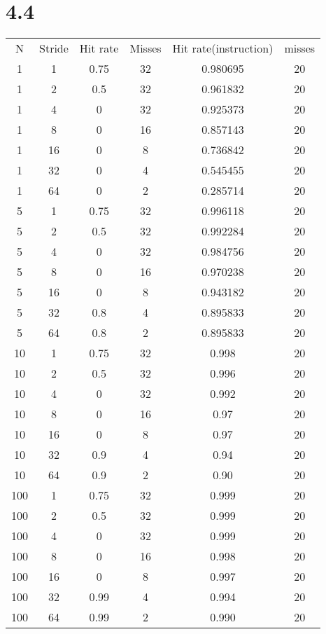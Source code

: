 \documentclass[]{article}
\begin{document}
\section*{4.4}
\begin{center}
	\begin{tabular}{c c c c c c}
		N &Stride & Hit rate & Misses & Hit rate(instruction) & misses\\
	1 & 1     &  0.75     & 32    &  0.980695    &  20\\
	1 & 2     &  0.5      & 32    &  0.961832    &  20\\
	1 & 4     &  0        & 32    &  0.925373    &  20\\
	1 & 8     &  0        & 16    &  0.857143    &  20\\
	1 & 16    &  0        &  8    &   0.736842   &20\\
	1 & 32    &  0        & 4     &  0.545455    &20 \\
	1 & 64    & 0         &2      &  0.285714    &20 \\
	5 & 1     & 0.75      &32     & 0.996118     &20 \\
	5 & 2     & 0.5       &32     & 0.992284     &20 \\
	5 & 4     & 0         & 32    &0.984756      & 20\\
	5 & 8     & 0         &16     & 0.970238     &20 \\
	5 & 16    & 0         &8      & 0.943182     & 20\\
	5 & 32    & 0.8        &4      & 0.895833     & 20\\
	5 & 64    & 0.8        &2      & 0.895833     & 20\\
	10& 1     & 0.75       &32    &0.998          &20\\
	10& 2     &0.5         &32    &0.996         &20\\
	10& 4     &0           &32    &0.992          &20\\
	10& 8     &0           &16    &0.97          &20\\
	10& 16    &0           &8      &0.97         &20\\
	10& 32    &0.9         &4     &0.94         &20\\
	10& 64    &0.9        &2      &0.90          &20\\
	100&1     &0.75       &32     &0.999        &20\\
	100&2     &0.5       &32     &0.999        &20\\
	100&4     &0         &32     &0.999        &20\\
	100&8     &0         &16     & 0.998        &20\\
	100&16    &0         &8     &0.997          &20\\
	100&32    &0.99      &4     &0.994          &20\\
	100&64    &0.99      &2     &0.990          &20\\
		
	\end{tabular}
\end{center}
\end{document}
